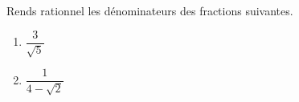 %
%
    Rends rationnel les dénominateurs des fractions suivantes.
    \begin{enumerate}[cols=2]
        \item $\dfrac{3}{\sqrt{5}}$
        \item $\dfrac{1}{4-\sqrt{2}}$
    \end{enumerate}
